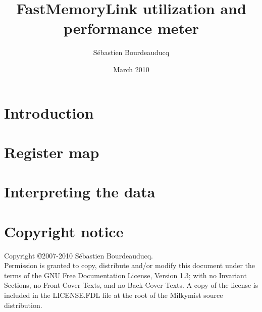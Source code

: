 \documentclass[a4paper,11pt]{article}
\title{FastMemoryLink utilization and performance meter}
\author{S\'ebastien Bourdeauducq}
\date{March 2010}
\begin{document}
\setlength{\parindent}{0pt}
\setlength{\parskip}{5pt}
\maketitle{}
\section{Introduction}

\section{Register map}

\section{Interpreting the data}

\section*{Copyright notice}
Copyright \copyright 2007-2010 S\'ebastien Bourdeauducq. \\
Permission is granted to copy, distribute and/or modify this document under the terms of the GNU Free Documentation License, Version 1.3; with no Invariant Sections, no Front-Cover Texts, and no Back-Cover Texts. A copy of the license is included in the LICENSE.FDL file at the root of the Milkymist source distribution.
\end{document}
